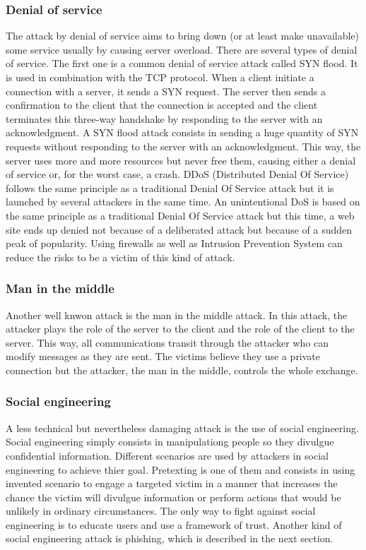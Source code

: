 \subsubsection{Denial of service}
The attack by denial of service aims to bring down (or at least make
unavailable) some service usually by causing server overload. There are several
types of denial of service. The first one is a common denial of service attack
called SYN flood. It is used in combination with the TCP protocol. When a client
initiate a connection with a server, it sends a SYN request. The server then
sends a confirmation to the client that the connection is accepted and the
client terminates this three-way handshake by responding to the server with an
acknowledgment. A SYN flood attack consists in sending a huge quantity of SYN
requests without responding to the server with an acknowledgment. This way, the
server uses more and more resources but never free them, causing either a denial
of service or, for the worst case, a crash. DDoS (Distributed Denial Of Service)
follows the same principle as a traditional Denial Of Service attack but it is
launched by several attackers in the same time. An unintentional DoS is based on
the same principle as a traditional Denial Of Service attack but this time, a
web site ends up denied not because of a deliberated attack but because of a
sudden peak of popularity. Using firewalls as well as Intrusion Prevention
System can reduce the risks to be a victim of this kind of attack.

\subsubsection{Man in the middle}
Another well knwon attack is the man in the middle attack. In this attack, the
attacker plays the role of the server to the client and the role of the client
to the server. This way, all communications transit through the attacker who can
modify messages as they are sent. The victims believe they use a private
connection but the attacker, the man in the middle, controls the whole exchange.

\subsubsection{Social engineering}
A less technical but nevertheless damaging attack is the use of social
engineering. Social engineering simply consists in manipulationg people so they
divulgue confidential information. Different scenarios are used by attackers in
social engineering to achieve thier goal. Pretexting is one of them and consists
in using invented scenario to engage a targeted victim in a manner that
increases the chance the victim will divulgue information or perform actions
that would be unlikely in ordinary circumstances. The only way to fight against
social engineering is to educate users and use a framework of trust. Another
kind of social engineering attack is phishing, which is described in the next
section.

